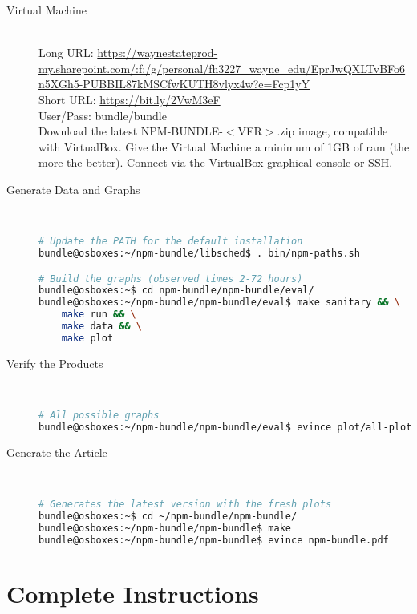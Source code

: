 \documentclass[a4paper]{article}
\begin{document}
\begin{description}
  \item[Virtual Machine] \hfill \\
    Long URL: \href{https://waynestateprod-my.sharepoint.com/:f:/g/personal/fh3227\_wayne\_edu/EprJwQXLTvBFo6n5XGh5-PUBBIL87kMSCfwKUTH8vlyx4w?e=Fcp1yY}{https://waynestateprod-my.sharepoint.com/:f:/g/personal/fh3227\_wayne\_edu/EprJwQXLTvBFo6n5XGh5-PUBBIL87kMSCfwKUTH8vlyx4w?e=Fcp1yY} \\
    Short URL: \href{https://bit.ly/2VwM3eF}{https://bit.ly/2VwM3eF}
    \hfill \\
    User/Pass: bundle/bundle \\

    Download the latest NPM-BUNDLE-${<}$VER${>}$.zip image, compatible
    with VirtualBox. Give the Virtual Machine a minimum of 1GB of ram
    (the more the better). Connect via the VirtualBox graphical
    console or SSH.
    
  \item[Generate Data and Graphs] \hfill \\
    \begin{lstlisting}[language=bash]
# Update the PATH for the default installation
bundle@osboxes:~/npm-bundle/libsched$ . bin/npm-paths.sh

# Build the graphs (observed times 2-72 hours)
bundle@osboxes:~$ cd npm-bundle/npm-bundle/eval/
bundle@osboxes:~/npm-bundle/npm-bundle/eval$ make sanitary && \
    make run && \
    make data && \
    make plot
    \end{lstlisting}
  \item[Verify the Products] \hfill \\
    \begin{lstlisting}[language=bash]
# All possible graphs
bundle@osboxes:~/npm-bundle/npm-bundle/eval$ evince plot/all-plots.pdf
    \end{lstlisting}
  \item[Generate the Article] \hfill \\
    \begin{lstlisting}[language=bash]
# Generates the latest version with the fresh plots
bundle@osboxes:~$ cd ~/npm-bundle/npm-bundle/
bundle@osboxes:~/npm-bundle/npm-bundle$ make
bundle@osboxes:~/npm-bundle/npm-bundle$ evince npm-bundle.pdf
    \end{lstlisting}
\end{description}

\clearpage

\section{Complete Instructions}
\end{document}
